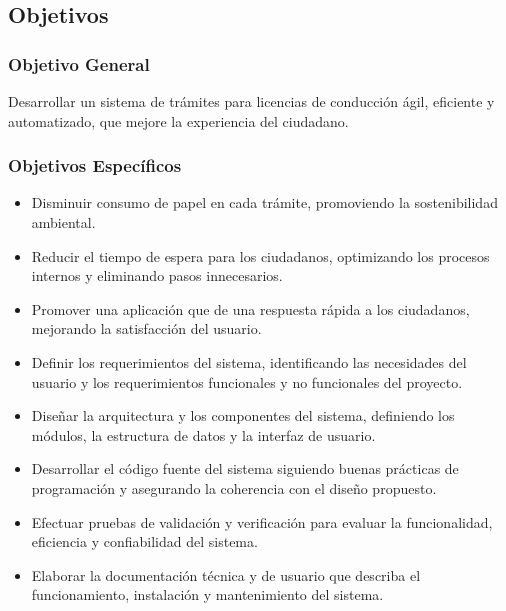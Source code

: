 \subsection{Objetivos}

\subsubsection{Objetivo General}
Desarrollar un sistema de trámites para licencias de conducción ágil, eficiente y automatizado, que mejore la experiencia del ciudadano.

\subsubsection{Objetivos Específicos}
\begin{itemize}
    \item Disminuir consumo de papel en cada trámite, promoviendo la sostenibilidad ambiental.
    \item Reducir el tiempo de espera para los ciudadanos, optimizando los procesos internos y eliminando pasos innecesarios.
    \item Promover una aplicación que de una respuesta rápida a los ciudadanos, mejorando la satisfacción del usuario.
    \item Definir los requerimientos del sistema, identificando las necesidades del usuario y los
      requerimientos funcionales y no funcionales del proyecto.
    \item Diseñar la arquitectura y los componentes del sistema, definiendo los módulos, la estructura de datos y la interfaz de usuario.
    \item Desarrollar el código fuente del sistema siguiendo buenas prácticas de programación y
      asegurando la coherencia con el diseño propuesto.
    \item Efectuar pruebas de validación y verificación para evaluar la funcionalidad, eficiencia
      y confiabilidad del sistema.
    \item Elaborar la documentación técnica y de usuario que describa el funcionamiento, instalación y mantenimiento del sistema.
\end{itemize}
